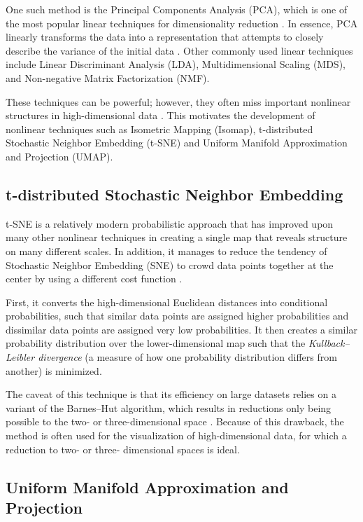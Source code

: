 \documentclass[english,bachelor,ul]{webisthesis} %
\begin{document}
One such method is the Principal Components Analysis (PCA), which is one of the most popular linear techniques for dimensionality reduction \citep{van2009dimensionality}. In essence, PCA linearly transforms the data into a representation that attempts to closely describe the variance of the initial data \citep{jolliffe2016principal}. Other commonly used linear techniques include Linear Discriminant Analysis (LDA), Multidimensional Scaling (MDS), and Non-negative Matrix Factorization (NMF).

These techniques can be powerful; however, they often miss important nonlinear structures in high-dimensional data \citep{Tenenbaum2000AGG}. This motivates the development of nonlinear techniques such as Isometric Mapping (Isomap), t-distributed Stochastic Neighbor Embedding (t-SNE) and Uniform Manifold Approximation and Projection (UMAP). 

\subsection*{t-distributed Stochastic Neighbor Embedding}

t-SNE is a relatively modern probabilistic approach that has improved upon many other nonlinear techniques in creating a single map that reveals structure on many different scales. In addition, it manages to reduce the tendency of Stochastic Neighbor Embedding (SNE) to crowd data points together at the center by using a different cost function \citep{van2008visualizing}. 

First, it converts the high-dimensional Euclidean distances into conditional probabilities, such that similar data points are assigned higher probabilities and dissimilar data points are assigned very low probabilities. It then creates a similar probability distribution over the lower-dimensional map such that the \textit{Kullback--Leibler divergence} (a measure of how one probability distribution differs from another) is minimized. 

The caveat of this technique is that its efficiency on large datasets relies on a variant of the Barnes--Hut algorithm, which results in reductions only being possible to the two- or three-dimensional space \citep{DBLP:journals/corr/abs-1301-3342}. Because of this drawback, the method is often used for the visualization of high-dimensional data, for which a reduction to two- or three- dimensional spaces is ideal.

\subsection*{Uniform Manifold Approximation and Projection}
\end{document}
